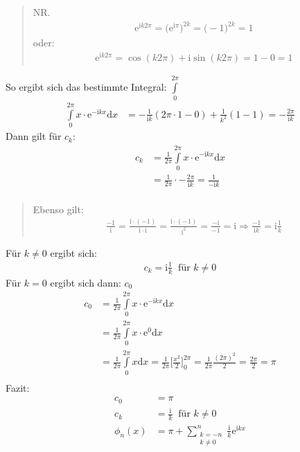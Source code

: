 \begin{quote}
	NR.\\
	\begin{align*}
	\mathrm{e}^{\mathrm{i}k2\pi}=\big(\mathrm{e}^{\mathrm{i}\pi}\big)^{2k}=\big(-1\big)^{2k}=1
	\end{align*}
	oder:\\
	\begin{align*}
	\mathrm{e}^{\mathrm{i}k2\pi}=\cos(k2\pi)+\mathrm{i}\sin(k2\pi)=1-0=1
	\end{align*}
\end{quote}
So ergibt sich das bestimmte Integral:  $ \int\limits_{0}^{2\pi}  $ \\
\begin{align*}
\int\limits_{0}^{2\pi}x\cdot \mathrm{e}^{-\mathrm{i}kx}\mathrm{d}x&=-\frac{1}{\mathrm{i}k}(2\pi\cdot 1-0)+\frac{1}{k^2}(1-1)=-\frac{2\pi}{\mathrm{i}k}
\end{align*}
Dann gilt für $ c_k $:\\
\begin{align*}
c_k&=\frac{1}{2\pi}\int\limits_{0}^{\mathrm{2\pi}} x\cdot\mathrm{e}^{-\mathrm{i}k x}\mathrm{d}x\\
&=\frac{1}{2\pi}\cdot-\frac{2\pi}{\mathrm{i}k}=\frac{1}{-\mathrm{i}k}\\
\end{align*}
\begin{quote}
	Ebenso gilt:\\
	\begin{align*}
	\frac{-1}{\mathrm{i}}=\frac{\mathrm{i}\cdot (-1)}{\mathrm{i}\cdot \mathrm{i}}=\frac{\mathrm{i}\cdot (-1)}{\mathrm{i^2}}=\frac{-\mathrm{i}}{-1}=\mathrm{i}\Rightarrow \frac{-1}{\mathrm{i}k}=\mathrm{i}\frac{1}{k}
	\end{align*}
\end{quote}
Für $ k\neq 0 $ ergibt sich:\\
\begin{align*}
c_k=\mathrm{i}\frac{1}{k} \;\;\text{für } k\neq 0
\end{align*}
Für $ k= 0 $ ergibt sich dann: $ c_0 $\\
\begin{align*}
c_0&=\frac{1}{2\pi}\int\limits_{0}^{2\pi} x\cdot \mathrm{e}^{-\mathrm{i}kx}\mathrm{d}x\\
&=\frac{1}{2\pi}\int\limits_{0}^{2\pi} x\cdot \mathrm{e}^{0}\mathrm{d}x\\
&=\frac{1}{2\pi}\int\limits_{0}^{2\pi} x\mathrm{d}x=\frac{1}{2\pi}\bigg[\frac{x^2}{2}\bigg]^{2\pi}_0=\frac{1}{2\pi}\frac{(2\pi)^2}{2}=\frac{2\pi}{2}=\pi\\
\end{align*}
Fazit:\\
\begin{align*}
c_0&=\pi\\
c_k&=\frac{\mathrm{i}}{k}\;\;\text{für } k\neq 0\\
\phi_n(x)&=\pi+\sum\limits_{\substack{k=-n\\k\neq 0}}^{n}\frac{\mathrm{i}}{k}\mathrm{e}^{\mathrm{i}kx}
\end{align*}
